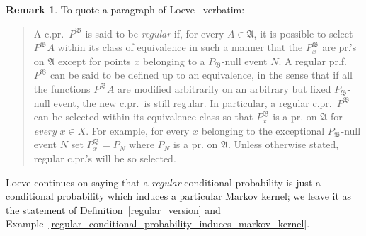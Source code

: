 \documentclass[
twoside=true,
paper=letter,
fontsize=9pt,
pagesize=auto,
leqno,
openany,
headsepline,
overfullrule,
]{scrbook}
\theoremstyle{plain}
\theoremstyle{plain}
\theoremstyle{definition}
\newtheorem{rmk}[thm]{Remark}
\theoremstyle{bfnoteitalic}
\theoremstyle{bfnoteroman}
\newcommand{\sigalg}[1]{\mathfrak{#1}}
\newcommand{\sigmaalgebra}{\sigalg{A}}
\newcommand{\measurespace}{X}
\newcommand{\mspaceelt}{x}
\begin{document}
\begin{rmk}\label{quote_loeve}
To quote a paragraph of Loeve~\cite{pt_loeve_1960} verbatim:
\begin{quote}
A c.pr.~$P^{\sigalg{B}}$ is said to be \emph{regular} if, for every $A\in\sigmaalgebra$, it is possible to select $P^\sigalg{B} A$ within its class of equivalence in such a manner that the $P_\mspaceelt^\sigalg{B}$ are pr.'s on $\sigmaalgebra$ except for points $\mspaceelt$ belonging to a $P_\sigalg{B}$-null event $N$.
A regular pr.f.~$P^\sigalg{B}$ can be said to be defined up to an equivalence, in the sense that if all the functions $P^\sigalg{B}A$ are modified arbitrarily on an arbitrary but fixed $P_\sigalg{B}$-null event, the new c.pr.~is still regular.
In particular, a regular c.pr.~$P^\sigalg{B}$ can be selected within its equivalence class so that $P_\mspaceelt^\sigalg{B}$ is a pr. on $\sigmaalgebra$ for \emph{every} $\mspaceelt\in\measurespace$.
For example, for every $\mspaceelt$ belonging to the exceptional $P_\sigalg{B}$-null event $N$ set $P_\mspaceelt^\sigalg{B} = P_N$ where $P_N$ is a pr. on $\sigmaalgebra$.  Unless otherwise stated, regular c.pr.'s will be so selected.
\end{quote}
Loeve continues on saying that a \emph{regular} conditional probability is just a conditional probability which induces a particular Markov kernel; we leave it as the statement of Definition~\ref{regular_version} and Example~\ref{regular_conditional_probability_induces_markov_kernel}.
\end{rmk}
\end{document}
